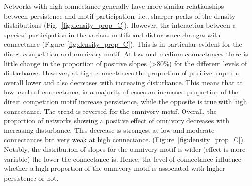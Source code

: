 \documentclass[12pt]{article}
\begin{document}
\begin{spacing}{2.0}
            Networks with high connectance generally have more similar relationships between persistence and motif participation, i.e., sharper peaks of the density distributions (Fig.~\ref{fig:density_prop_C}). However, the interaction between a species' participation in the various motifs and disturbance changes with connectance  (Figure~\ref{fig:density_prop_C}).
            This is in particular evident for the direct competition and omnivory motif. At low and medium connectances there is little change in the proportion of positive slopes (\textgreater80\%) for the different levels of disturbance. However, at high connectances the proportion of positive slopes is overall lower and also decreases with increasing disturbance. This means that at low levels of connectance, in a majority of cases an increased proportion of the direct competition motif increase persistence, while the opposite is true with high connectance. 
            The trend is reversed for the omnivory motif.
            Overall, the proportion of networks showing a positive effect of omnivory decreases with increasing disturbance.
            This decrease is strongest at low and moderate connectances but very weak at high connectance. (Figure~\ref{fig:density_prop_C}). Notably, the distribution of slopes for the omnivory motif is wider (effect is more variable) the lower the connectance is.
            Hence, the level of connectance influence whether a high proportion of the omnivory motif is associated with higher persistence or not.



\end{spacing}
\end{document}
